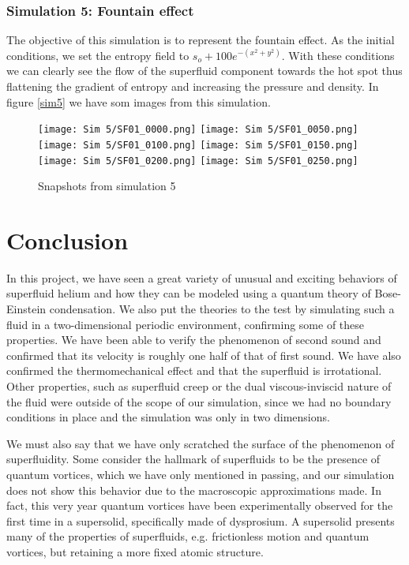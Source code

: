 \documentclass{article}
\begin{document}
\subsubsection{Simulation 5: Fountain effect}
The objective of this simulation is to represent the fountain effect. As the initial conditions, we set the entropy field to \(s_o + 100e^{-(x^2+y^2)}\). With these conditions we can clearly see the flow of the superfluid component towards the hot spot thus flattening the gradient of entropy and increasing the pressure and density. In figure \ref{sim5} we have som images from this simulation.

\begin{figure}[h]
    \texttt{[image: Sim 5/SF01\_0000.png]}
    \texttt{[image: Sim 5/SF01\_0050.png]}
    \texttt{[image: Sim 5/SF01\_0100.png]}
    \texttt{[image: Sim 5/SF01\_0150.png]}
    \texttt{[image: Sim 5/SF01\_0200.png]}
    \texttt{[image: Sim 5/SF01\_0250.png]}
    \caption{Snapshots from simulation 5}
    \label{sim4}
\end{figure}

\section{Conclusion}


In this project, we have seen a great variety of unusual and exciting behaviors of superfluid helium and how they can be modeled using a quantum theory of Bose-Einstein condensation.  We also put the theories to the test by simulating such a fluid in a two-dimensional periodic environment, confirming some of these properties.  We have been able to verify the phenomenon of second sound and confirmed that its velocity is roughly one half of that of first sound.  We have also confirmed the thermomechanical effect and that the superfluid is irrotational.  Other properties, such as superfluid creep or the dual viscous-inviscid nature of the fluid were outside of the scope of our simulation, since we had no boundary conditions in place and the simulation was only in two dimensions.

We must also say that we have only scratched the surface of the phenomenon of superfluidity.  Some consider the hallmark of superfluids to be the presence of quantum vortices, which we have only mentioned in passing, and our simulation  does not show this behavior due to the macroscopic approximations made.  In fact, this very year quantum vortices have been experimentally observed for the first time in a supersolid, specifically made of dysprosium.  A supersolid presents many of the properties of superfluids, e.g. frictionless motion and quantum vortices, but retaining a more fixed atomic structure.
\end{document}

